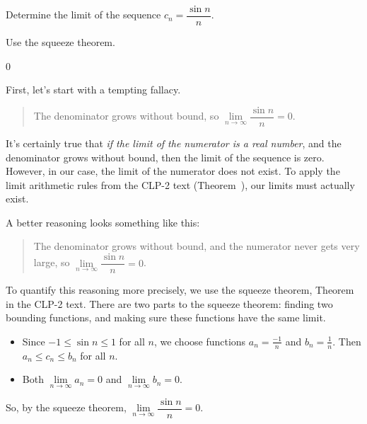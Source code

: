\begin{Mquestion}
Determine the limit of the sequence
$c_n = \dfrac{\sin n}{n}$.
\end{Mquestion}
\begin{hint}
Use the squeeze theorem.
\end{hint}
\begin{answer}
0
\end{answer}
\begin{solution}
First, let's start with a  tempting fallacy.
\begin{quote}\color{red}
The denominator grows without bound, so
$\lim\limits_{n \to \infty}\dfrac{\sin n}{n}=0$.
\end{quote}

It's certainly true that \emph{if the limit of the numerator is a real number}, and the denominator grows without bound, then the limit of the sequence is zero. However, in our case, the limit of the numerator does not exist. To apply the limit arithmetic rules from the CLP-2 text (Theorem~), our limits must actually exist.

A better reasoning looks something like this:
\begin{quote}\color{red}
The denominator grows without bound, and the numerator never gets very large, so
$\lim\limits_{n \to \infty}\dfrac{\sin n}{n}=0$.
\end{quote}

To quantify this reasoning more precisely, we use the squeeze theorem, Theorem~ in the CLP-2 text. There are two parts to the squeeze theorem: finding two bounding functions, and making sure these functions have the same limit.
\begin{itemize}
\item Since $-1\leq \sin n \leq 1$ for all $n$, we choose functions $a_n = \frac{-1}{n}$ and $b_n = \frac{1}{n}$.  Then $a_n \leq c_n \leq b_n$ for all $n$.
\item Both $\lim\limits_{n \to \infty}a_n=0$ and  $\lim\limits_{n \to \infty}b_n=0$.
\end{itemize}
So, by the squeeze theorem, $\lim\limits_{n \to \infty}\dfrac{\sin n}{n}=0$.
\end{solution}


